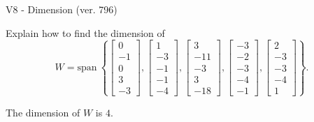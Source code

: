 \begin{exercise}
  \begin{exerciseTitle}V8 - Dimension (ver. 796)\end{exerciseTitle}
  \begin{exerciseStatement}
    Explain how to find the dimension of 
\[W=\mathrm{span}\ \left\{\left[\begin{array}{r}
0 \\
-1 \\
0 \\
3 \\
-3
\end{array}\right] , \left[\begin{array}{r}
1 \\
-3 \\
-1 \\
-1 \\
-4
\end{array}\right] , \left[\begin{array}{r}
3 \\
-11 \\
-3 \\
3 \\
-18
\end{array}\right] , \left[\begin{array}{r}
-3 \\
-2 \\
-3 \\
-4 \\
-1
\end{array}\right] , \left[\begin{array}{r}
2 \\
-3 \\
-3 \\
-4 \\
1
\end{array}\right]\right\}.\]



  \end{exerciseStatement}
  \begin{exerciseAnswer}
   The dimension of \(W\) is  \(4\).
  


  \end{exerciseAnswer}
\end{exercise}